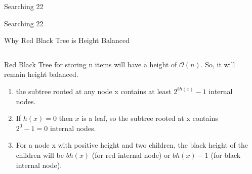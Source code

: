 \documentclass{beamer}
\begin{document}
\begin{frame}{Searching 22}
\centering

\end{frame}

\begin{frame}{Searching 22}
\centering

\end{frame}

\begin{frame}{Why Red Black Tree is Height Balanced}
\begin{columns}
        \begin{column}{0.5\textwidth}
            
            Red Black Tree for storing n items will have a height of $\mathcal{O}(n)$. So, it will remain height balanced.

            \begin{enumerate}
                \item the subtree rooted at any node x contains at least $2^{bh(x)} - 1$  internal nodes. 
                \item If $h(x) = 0$ then $x$ is a leaf, so the subtree rooted at x contains $2^0-1 = 0$ internal nodes.
                \item For a node x with positive height and two children, the black height of the children will be $ bh(x) $ (for red internal node) or  $bh(x) - 1$ (for black internal node).
                
                
            \end{enumerate}
            
        \end{column}
        
        \begin{column}{0.5\textwidth}
            \centering
            
            
            
           
            
        \end{column}

\end{columns}    
\end{frame}
\end{document}

